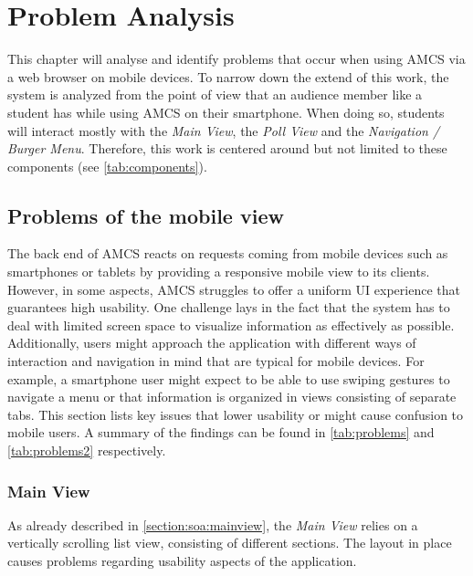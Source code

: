 \chapter{Problem Analysis}
\label{chapter:concept}
This chapter will analyse and identify problems that occur when using AMCS via a web browser on mobile
devices. To narrow down the extend of this work, the system is analyzed from the point of view that an audience member like a student has while using AMCS on their smartphone. When doing so, students will interact mostly with the \emph{Main View}, the \emph{Poll View} and the \emph{Navigation / Burger Menu}. Therefore, this work is centered around but not limited to these components (see \autoref{tab:components}).

\section{Problems of the mobile view}
\label{section:con:problems}
The back end of AMCS reacts on requests coming from mobile devices such as smartphones or tablets by providing a responsive mobile view to its clients. However, in some aspects, AMCS struggles to offer a uniform UI experience that guarantees high usability.
One challenge lays in the fact that the system has to deal with limited screen space to visualize information as effectively as possible. Additionally, users might approach the application with different ways of interaction and navigation in mind that are typical for mobile devices. For example, a smartphone user might expect to be able to use swiping gestures to navigate a menu or that information is organized in views consisting of separate tabs. This section lists key issues that lower usability or might cause confusion to mobile users. A summary of the findings can be found in \autoref{tab:problems} and \autoref{tab:problems2} respectively.

\subsection{Main View}
As already described in \autoref{section:soa:mainview}, the \emph{Main View} relies on a vertically scrolling list view, consisting of different sections. The layout in place causes problems regarding usability aspects of the application.


